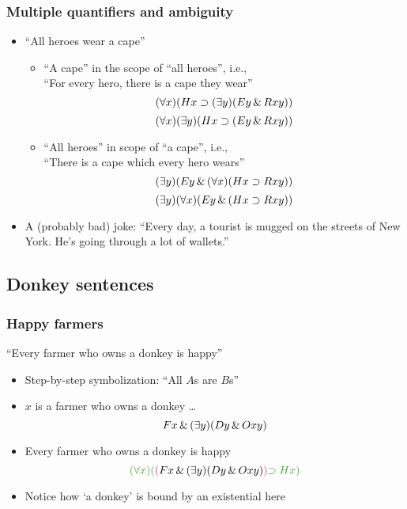 \begin{frame}
    \frametitle{Multiple quantifiers and ambiguity}

\begin{itemize}[<+->]
\item ``All heroes wear a cape''
\begin{itemize}[<+->]
\item ``A cape'' in the scope of ``all heroes'', i.e.,\\
``For every hero, there is a cape they wear''\pauses
\[
(\forall x)(Hx \supset (\exists y)(Ey \,\&\, Rxy))
\]
\[
(\forall x)(\exists y)(Hx \supset (Ey \,\&\, Rxy))
\]
\item ``All heroes'' in scope of ``a cape'', i.e.,\\
``There is a cape which every hero wears''\pauses
\[
(\exists y)(Ey \,\&\, (\forall x)(Hx \supset Rxy))
\]
\[
(\exists y)(\forall x)(Ey \,\&\, (Hx \supset Rxy))
\]
\end{itemize}

\item A (probably bad) joke: ``Every day, a tourist is mugged on the streets of New York. He's going through a lot of wallets.'' %

\end{itemize}
\end{frame}


\subsection{\quad Donkey sentences}

\begin{frame}
    \frametitle{Happy farmers}

``Every farmer who owns a donkey is happy''

\begin{itemize}[<+->]
\item Step-by-step symbolization: ``All $A$s are $B$s''
\item $x$ is a farmer who owns a donkey \dots\[
Fx \,\&\, (\exists y)(Dy \,\&\, Oxy)
\]
\item \textcolor{highlightA}{Every} farmer who owns a donkey \textcolor{highlightA}{is happy}
\[
\textcolor{highlightA}{\qt{\forall}{x}(}\textcolor{OGlyallpink}{(}F\qv{x} \land \qt{\exists}{y}(D\qv{y} \land O\qr{x}{y})\textcolor{OGlyallpink}{)} \textcolor{highlightA}{\eif H\qv{x})}
\]
\item Notice how `a donkey' is bound by an existential here
\end{itemize}
\end{frame}

